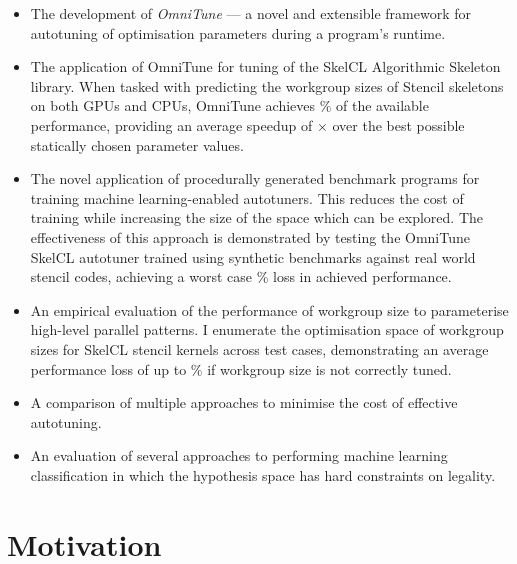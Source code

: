 \begin{itemize}
\item The development of \emph{OmniTune} --- a novel and extensible
  framework for autotuning of optimisation parameters during a
  program's runtime.
\item The application of OmniTune for tuning of the SkelCL Algorithmic
  Skeleton library. When tasked with predicting the workgroup sizes of
  Stencil skeletons on both GPUs and CPUs, OmniTune achieves
  $\%$ of the available
  performance, providing an average speedup of
  $\times$ over the best
  possible statically chosen parameter values.
\item The novel application of procedurally generated benchmark
  programs for training machine learning-enabled autotuners. This
  reduces the cost of training while increasing the size of the space
  which can be explored. The effectiveness of this approach is
  demonstrated by testing the OmniTune SkelCL autotuner trained using
  synthetic benchmarks against  real world
  stencil codes, achieving a worst case
  $\%$
  loss in achieved performance.
\item An empirical evaluation of the performance of workgroup size to
  parameterise high-level parallel patterns. I enumerate the
  optimisation space of workgroup sizes for SkelCL stencil kernels
  across  test cases, demonstrating an
  average performance loss of up to
  $\%$ if workgroup size is not
  correctly tuned. %
\item A comparison of multiple approaches to minimise the cost of
  effective autotuning. 
\item An evaluation of several approaches to performing machine
  learning classification in which the hypothesis space has hard
  constraints on legality. 
\end{itemize}


\section{Motivation}

